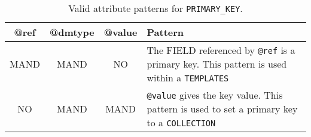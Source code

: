 \begin{table}[!htbp]
\small
\centering
\begin{tabulary}{\linewidth}{|c|c|c|J|}
    \hline 
        \textbf{@ref} &
        \textbf{@dmtype} &
        \textbf{@value} &
        \textbf{Pattern}\\
    \hline      \hline  
        MAND &           
        MAND &           
        NO &           
        The FIELD referenced by \texttt{@ref} is a primary key. This pattern is used within a \texttt{TEMPLATES} \\
    \hline     
        NO &           
        MAND &           
        MAND &           
        \texttt{@value} gives the key value. This pattern is used to set a primary key to a \texttt{COLLECTION}\\
   \hline 
\end{tabulary}
     \caption{Valid attribute patterns for  \texttt{PRIMARY\_KEY}.}
     \label{tbl:primarykey-pattern}
\end{table}
